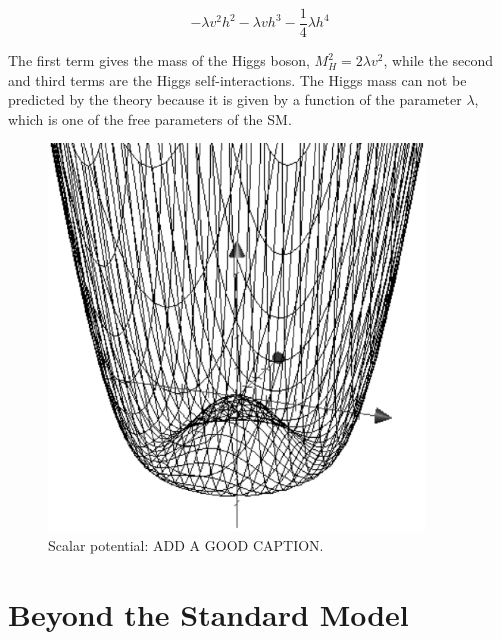     \begin{equation}
      -\lambda v^2h^2 - \lambda v h^3 - \frac{1}{4}\lambda h^4
    \end{equation}

    The first term gives the mass of the Higgs boson, $M^2_H = 2\lambda v^2$, while the second and third terms are the Higgs self-interactions.
    The Higgs mass can not be predicted by the theory because it is given by a function of the parameter $\lambda$, which is one of the free parameters of the \gls{SM}.
    
    \begin{figure}[h]
    \centering
      \includegraphics[width = 10cm]{Pictures/SM/mexHat.eps}
    \caption{Scalar potential: ADD A GOOD CAPTION.}
    \label{fig:scalarPotential}
    \end{figure}


  \section{Beyond the Standard Model}


